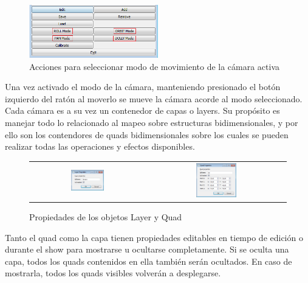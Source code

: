 \begin{figure}[H]
  \centering
    \includegraphics[width=0.5\textwidth]{./Cap5_vmt/vmt_SceneBotonera.png}
  \caption{Acciones para seleccionar modo de movimiento de la cámara activa}
  \label{fig:VMT-CameraActions}
\end{figure}

Una vez activado el modo de la cámara, manteniendo presionado el botón izquierdo del ratón al moverlo se mueve la cámara acorde al modo seleccionado.
Cada cámara es a su vez un contenedor de capas o layers. Su propósito es manejar todo lo relacionado al mapeo sobre estructuras bidimensionales, y por ello son los contendores de quads bidimensionales sobre los cuales se pueden realizar todas las operaciones y efectos disponibles.

\begin{figure}
	\begin{center}
		\begin{tabular}[c]{cc}
			\includegraphics[width=0.3\textwidth]{./Cap5_vmt/vmt_layerProperties.png}
				&        
			\includegraphics[width=0.3\textwidth]{./Cap5_vmt/vmt_quadProperties.png}
		\end{tabular}
	\end{center}
	\caption{Propiedades de los objetos Layer y Quad}
	\label{fig:VMT-LayerQuadProperties}
\end{figure}

Tanto el quad como la capa tienen propiedades editables en tiempo de edición o durante el show para mostrarse u ocultarse completamente. Si se oculta una capa, todos los quads contenidos en ella también serán ocultados. En caso de mostrarla, todos los quads visibles volverán a desplegarse.

